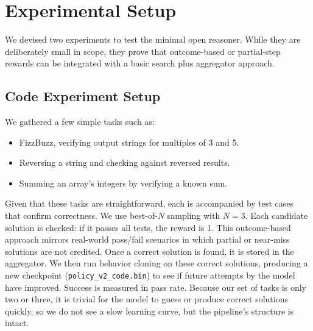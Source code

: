\documentclass{article}
\begin{document}
\section{Experimental Setup}
We devised two experiments to test the minimal open reasoner. While they are deliberately small in scope, they prove that outcome-based or partial-step rewards can be integrated with a basic search plus aggregator approach.

\subsection{Code Experiment Setup}
We gathered a few simple tasks such as:
\begin{itemize}
\item FizzBuzz, verifying output strings for multiples of 3 and 5.
\item Reversing a string and checking against reversed results.
\item Summing an array’s integers by verifying a known sum.
\end{itemize}
Given that these tasks are straightforward, each is accompanied by test cases that confirm correctness. We use best-of-\(N\) sampling with \(N=3\). Each candidate solution is checked: if it passes all tests, the reward is 1. This outcome-based approach mirrors real-world pass/fail scenarios in which partial or near-miss solutions are not credited. Once a correct solution is found, it is stored in the aggregator. We then run behavior cloning on these correct solutions, producing a new checkpoint (\texttt{policy\_v2\_code.bin}) to see if future attempts by the model have improved. Success is measured in pass rate. Because our set of tasks is only two or three, it is trivial for the model to guess or produce correct solutions quickly, so we do not see a slow learning curve, but the pipeline’s structure is intact.
\end{document}
